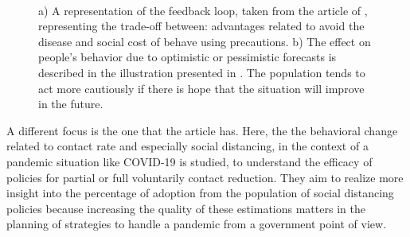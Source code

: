 \begin{figure}[h]
	\centering
	 \quad
	 \\
	\caption[Game theory]{a) A representation of the feedback loop, taken from the article of \cite{Wang_2015}, representing the trade-off between: advantages related to avoid the disease and social cost of behave using precautions.  b) The effect on people's behavior due to optimistic or pessimistic forecasts is described in the illustration presented in \cite{Auld_2003}. The population tends to act more cautiously if there is hope that the situation will improve in the future.}
	\label{fig:abm_game}
\end{figure}

A different focus is the one that the article  \cite{Gosak_2021_game} has. Here, the the behavioral change related to contact rate and especially social distancing, in the context of a pandemic situation like COVID-19  is studied, to understand the efficacy of policies for partial or full voluntarily contact reduction. They aim to realize more insight into the percentage of adoption from the population of social distancing policies because increasing the quality of these estimations matters in the planning of strategies to handle a pandemic from a government point of view.

